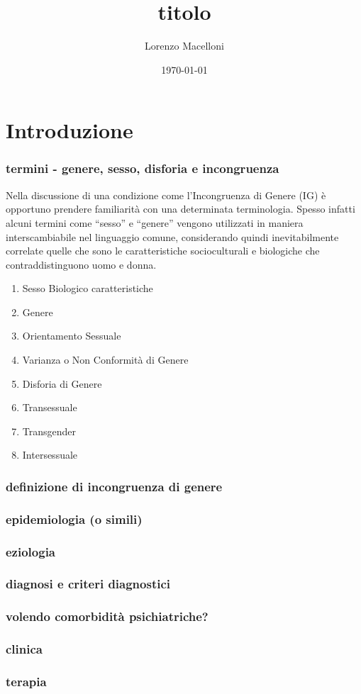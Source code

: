 \documentclass[11pt]{article}
\author{Lorenzo Macelloni}
\date{\today}
\title{titolo}
\begin{document}
\maketitle
\tableofcontents

\section{Introduzione}
\label{sec:org3966cb0}
\subsubsection{termini - genere, sesso, disforia e incongruenza}
\label{sec:org0853b23}
Nella discussione di una condizione come l'Incongruenza di Genere (IG) è opportuno prendere familiarità con una determinata terminologia.
Spesso infatti alcuni termini come ``sesso'' e ``genere'' vengono utilizzati in maniera interscambiabile nel linguaggio comune, considerando quindi inevitabilmente correlate quelle che sono le caratteristiche socioculturali e biologiche che contraddistinguono uomo e donna.
\begin{enumerate}
\item Sesso Biologico
\label{sec:org6d018ef}
caratteristiche
\item Genere
\label{sec:org752e3ec}

\item Orientamento Sessuale
\label{sec:orgf479089}
\item Varianza o Non Conformità di Genere
\label{sec:org479dddf}
\item Disforia di Genere
\label{sec:orgb6e920e}
\item Transessuale
\label{sec:org0294a8a}
\item Transgender
\label{sec:org4edc4c9}
\item Intersessuale
\label{sec:org41ebcdd}
\end{enumerate}
\subsubsection{definizione di incongruenza di genere}
\label{sec:org13e9171}
\subsubsection{epidemiologia (o simili)}
\label{sec:org87a78c3}
\subsubsection{eziologia}
\label{sec:org3c5db45}
\subsubsection{diagnosi e criteri diagnostici}
\label{sec:orgfbb8e55}
\subsubsection{volendo comorbidità psichiatriche?}
\label{sec:org6414bf7}
\subsubsection{clinica}
\label{sec:orgefefc5d}
\subsubsection{terapia}
\label{sec:orge4bf44e}
\end{document}
